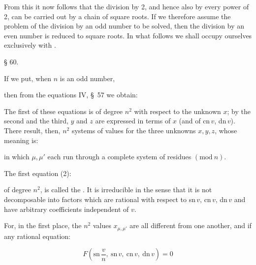
From this it now follows that the division by 2, and hence also by
every power of 2, can be carried out by a chain of square roots. If we
therefore assume the problem of the division by an odd number to be
solved, then the division by an even number is reduced to
square roots. In what follows we shall occupy ourselves exclusively
with .

\begin{center}
§ 60. 
\end{center}

If we put, when $n$ is an odd number,


then from the equations IV, \S\ 57 we obtain:


The first of these equations is of degree $n^2$ with respect to the
unknown $x$; by the second and the third, $y$ and $z$ are expressed
 in terms of $x$ (and of cn\,$v$, dn\,$v$). There result,
then, $n^2$ systems of values for the three unknowns $x, y, z$, whose
meaning is:


in which $\mu, \mu'$ each run through a complete system of residues
$(\mathrm{mod}\ n)$.

The first equation (2):


of degree $n^2$, is called the . It
is irreducible in the sense that it is not decomposable into factors
which are rational with respect to sn\,$v$, cn\,$v$, dn\,$v$ and have
arbitrary coefficients independent of $v$.

For, in the first place, the $n^2$ values $x_{\mu,\mu'}$ are all
different from one another, and if any rational equation:

\[
F\left(\mathrm{sn}\,\frac{v}{n},\ \mathrm{sn}\,v,\ \mathrm{cn}\,v,\ \mathrm{dn}\,v\right) = 0
\]
